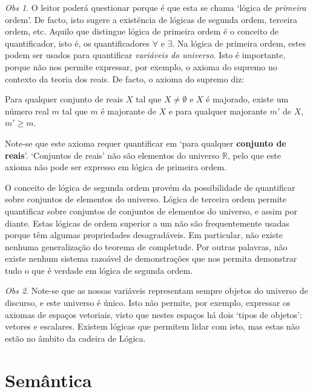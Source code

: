 \documentclass{report}
\theoremstyle{definition}
\theoremstyle{remark}
\newtheorem{obs}{Obs}
\newcommand{\R}{\mathbb{R}}
\begin{document}
	\begin{obs}
	O leitor poderá questionar porque é que esta se chama `lógica de \emph{primeira} ordem'. De facto, isto sugere a existência de lógicas de segunda ordem, terceira ordem, etc. Aquilo que distingue lógica de primeira ordem é o conceito de quantificador, isto é, os quantificadores $\forall$ e $\exists$. Na lógica de primeira ordem, estes podem ser usados para quantificar \emph{variáveis do universo}. Isto é importante, porque não nos permite expressar, por exemplo, o axioma do supremo no contexto da teoria dos reais. De facto, o axioma do supremo diz:
	
	\begin{center}
	Para qualquer conjunto de reais $X$ tal que $X \neq \emptyset$ e $X$ é majorado, existe um número real $m$ tal que $m$ é majorante de $X$ e para qualquer majorante $m'$ de $X$, $m' \geq m$.
	\end{center}
	
	Note-se que este axioma requer quantificar em `para qualquer \textbf{conjunto de reais}'. `Conjuntos de reais' não são elementos do universo $\R$, pelo que este axioma não pode ser expresso em lógica de primeira ordem.
	
	O conceito de lógica de segunda ordem provém da possibilidade de quantificar sobre conjuntos de elementos do universo. Lógica de terceira ordem permite quantificar sobre conjuntos de conjuntos de elementos do universo, e assim por diante. Estas lógicas de ordem superior a um não são frequentemente usadas porque têm algumas propriedades desagradáveis. Em particular, não existe nenhuma generalização do teorema de completude. Por outras palavras, não existe nenhum sistema razoável de demonstrações que nos permita demonstrar tudo o que é verdade em lógica de segunda ordem.
	\end{obs}
	
	\begin{obs}
	Note-se que as nossas variáveis representam sempre objetos do universo de discurso, e este universo é único. Isto não permite, por exemplo, expressar os axiomas de espaços vetoriais, visto que nestes espaços há dois `tipos de objetos': vetores e escalares. Existem lógicas que permitem lidar com isto, mas estas não estão no âmbito da cadeira de Lógica.
	\end{obs}
	
	\section{Semântica}
	
\end{document}
